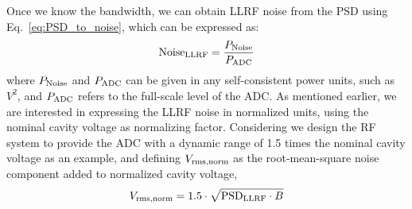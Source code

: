 \documentclass[a4paper,12pt]{article}
\begin{document}
Once we know the bandwidth, we can obtain LLRF noise from the PSD using Eq.~\eqref{eq:PSD_to_noise}, which can be expressed as:
\begin{equation}
  \centering {\rm Noise}_{\rm LLRF} = \frac{P_{\rm Noise}}{P_{\rm ADC}}
  \label{eq:dBc_def}
\end{equation}
where $P_{\rm Noise}$ and $P_{\rm ADC}$ can be given in any self-consistent power units, such as $V^2$,
and $P_{\rm ADC}$ refers to the full-scale level of the \hbox{ADC}.
As mentioned earlier, we are interested in expressing the LLRF noise in normalized units, using the nominal cavity voltage as normalizing factor. Considering we design the RF system to provide the ADC with a dynamic range of 1.5 times the nominal cavity voltage as an example, 
and defining $V_{\rm rms,norm}$ as the root-mean-square noise component added to
normalized cavity voltage,
\begin{equation}
  \centering V_{\rm rms,norm} = 1.5 \cdot \sqrt{{\rm PSD}_{\rm LLRF} \cdot B}
  \label{eq:v_noise_final}
\end{equation}
\end{document}
